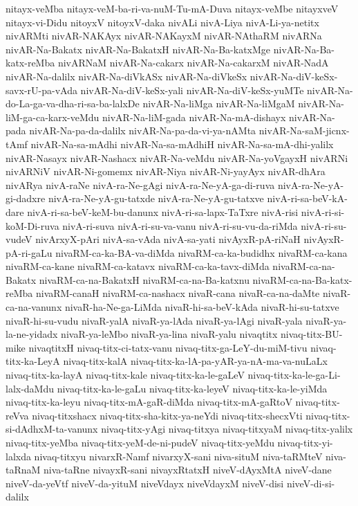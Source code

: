 {nitayx-veMba
nitayx-veM-ba-ri-va-nuM-Tu-mA-Duva
nitayx-veMbe
nitayxveV
nitayx-vi-Didu
nitoyxV
nitoyxV-daka
nivALi
nivA-Liya
nivA-Li-ya-netitx
nivARMti
nivAR-NAKAyx
nivAR-NAKayxM
nivAR-NAthaRM
nivARNa
nivAR-Na-Bakatx
nivAR-Na-BakatxH
nivAR-Na-Ba-katxMge
nivAR-Na-Ba-katx-reMba
nivARNaM
nivAR-Na-cakarx
nivAR-Na-cakarxM
nivAR-NadA
nivAR-Na-dalilx
nivAR-Na-diVkASx
nivAR-Na-diVkeSx
nivAR-Na-diV-keSx-savx-rU-pa-vAda
nivAR-Na-diV-keSx-yali
nivAR-Na-diV-keSx-yuMTe
nivAR-Na-do-La-ga-va-dha-ri-sa-ba-lalxDe
nivAR-Na-liMga
nivAR-Na-liMgaM
nivAR-Na-liM-ga-ca-karx-veMdu
nivAR-Na-liM-gada
nivAR-Na-mA-dishayx
nivAR-Na-pada
nivAR-Na-pa-da-dalilx
nivAR-Na-pa-da-vi-ya-nAMta
nivAR-Na-saM-jicnx-tAmf
nivAR-Na-sa-mAdhi
nivAR-Na-sa-mAdhiH
nivAR-Na-sa-mA-dhi-yalilx
nivAR-Nasayx
nivAR-Nashacx
nivAR-Na-veMdu
nivAR-Na-yoVgayxH
nivARNi
nivARNiV
nivAR-Ni-gomemx
nivAR-Niya
nivAR-Ni-yayAyx
nivAR-dhAra
nivARya
nivA-raNe
nivA-ra-Ne-gAgi
nivA-ra-Ne-yA-ga-di-ruva
nivA-ra-Ne-yA-gi-dadxre
nivA-ra-Ne-yA-gu-tatxde
nivA-ra-Ne-yA-gu-tatxve
nivA-ri-sa-beV-kA-dare
nivA-ri-sa-beV-keM-bu-danunx
nivA-ri-sa-lapx-TaTxre
nivA-risi
nivA-ri-si-koM-Di-ruva
nivA-ri-suva
nivA-ri-su-va-vanu
nivA-ri-su-vu-da-riMda
nivA-ri-su-vudeV
nivArxyX-pAri
nivA-sa-vAda
nivA-sa-yati
nivAyxR-pA-riNaH
nivAyxR-pA-ri-gaLu
nivaRM-ca-ka-BA-va-diMda
nivaRM-ca-ka-budidhx
nivaRM-ca-kana
nivaRM-ca-kane
nivaRM-ca-katavx
nivaRM-ca-ka-tavx-diMda
nivaRM-ca-na-Bakatx
nivaRM-ca-na-BakatxH
nivaRM-ca-na-Ba-katxnu
nivaRM-ca-na-Ba-katx-reMba
nivaRM-canaH
nivaRM-ca-nashacx
nivaR-cana
nivaR-ca-na-daMte
nivaR-ca-na-vanunx
nivaR-ha-Ne-ga-LiMda
nivaR-hi-sa-beV-kAda
nivaR-hi-su-tatxve
nivaR-hi-su-vudu
nivaR-yalA
nivaR-ya-lAda
nivaR-ya-lAgi
nivaR-yala
nivaR-ya-la-ne-yidadx
nivaR-ya-leMbo
nivaR-ya-lina
nivaR-yalu
nivaqtitx
nivaq-titx-BU-mike
nivaqtitxH
nivaq-titx-ci-tatx-vanu
nivaq-titx-ga-LeY-du-miM-tivu
nivaq-titx-ka-LeyA
nivaq-titx-kalA
nivaq-titx-ka-lA-pa-yAR-ya-nA-ma-va-nuLaLx
nivaq-titx-ka-layA
nivaq-titx-kale
nivaq-titx-ka-le-gaLeV
nivaq-titx-ka-le-ga-Li-lalx-daMdu
nivaq-titx-ka-le-gaLu
nivaq-titx-ka-leyeV
nivaq-titx-ka-le-yiMda
nivaq-titx-ka-leyu
nivaq-titx-mA-gaR-diMda
nivaq-titx-mA-gaRtoV
nivaq-titx-reVva
nivaq-titxshacx
nivaq-titx-sha-kitx-ya-neYdi
nivaq-titx-shecxVti
nivaq-titx-si-dAdhxM-ta-vanunx
nivaq-titx-yAgi
nivaq-titxya
nivaq-titxyaM
nivaq-titx-yalilx
nivaq-titx-yeMba
nivaq-titx-yeM-de-ni-pudeV
nivaq-titx-yeMdu
nivaq-titx-yi-lalxda
nivaq-titxyu
nivarxR-Namf
nivarxyX-sani
niva-situM
niva-taRMteV
niva-taRnaM
niva-taRne
nivayxR-sani
nivayxRtatxH
niveV-dAyxMtA
niveV-dane
niveV-da-yeVtf
niveV-da-yituM
niveVdayx
niveVdayxM
niveV-disi
niveV-di-si-dalilx
}
